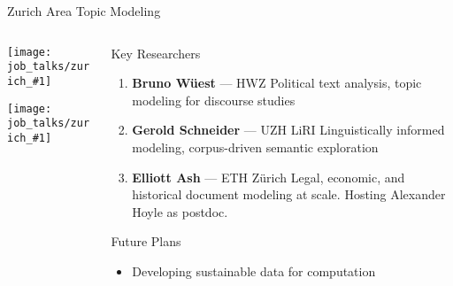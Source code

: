 \documentclass[compress]{beamer}
\newcommand{\gfxz}[2]{
	\begin{center}
		\texttt{[image: job\_talks/zurich\_\#1]}
	\end{center}
}
\begin{document}
\begin{frame}{Zurich Area Topic Modeling}
\begin{columns}
  \begin{column}{0.25\textwidth}
  	\gfxz{hwz}{.8}
  	\gfxz{eth}{.9}
  \end{column}
  \begin{column}{0.7\textwidth}
    \begin{block}{Key Researchers}
      \begin{enumerate}
        \item \textbf{Bruno Wüest} — HWZ  
        Political text analysis, topic modeling for discourse studies

        \item \textbf{Gerold Schneider} — UZH LiRI  
        Linguistically informed modeling, corpus-driven semantic exploration

        \item \textbf{Elliott Ash} — ETH Z\"urich  
        Legal, economic, and historical document modeling at scale.  Hosting Alexander Hoyle as postdoc.
      \end{enumerate}
    \end{block}

    \begin{block}{Future Plans}
      \begin{itemize}
        \item Developing sustainable data for computation
      \end{itemize}
    \end{block}
  \end{column}
\end{columns}
\end{frame}
\end{document}
